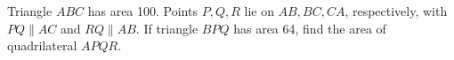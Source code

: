 Triangle $ABC$ has area 100. Points $P,Q,R$ lie on $AB,BC,CA$, respectively, with $PQ\parallel AC$ and $RQ\parallel AB$. If triangle $BPQ$ has area 64, find the area of quadrilateral $APQR$.
